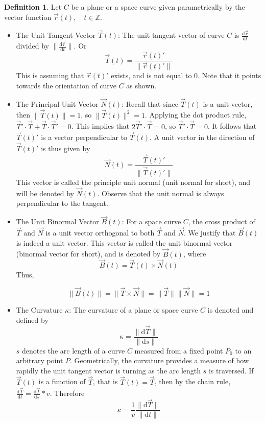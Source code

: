 \documentclass[11pt]{article}
\theoremstyle{plain} %
\theoremstyle{definition}
\newtheorem*{definition}{Definition} %
\theoremstyle{example}
\theoremstyle{remark}
\begin{document}
\begin{definition}

	Let $C$ be a plane or a space curve given parametrically by the vector function $\vec{r}(t), \quad t \in \mathbb Z$.
	
	\begin{itemize}
	
		\item The Unit Tangent Vector $\vec{T}(t)$: The unit tangent vector of curve $C$ is $\frac{\mathrm d \vec{r}}{\mathrm d t}$ divided by $\|\frac{\mathrm d \vec{r}}{\mathrm d t}\|$. Or $$\vec{T}(t) = \frac{\vec{r}(t)'}{\| \vec{r}(t)'\|}$$ This is assuming that $\vec{r}(t)'$ exists, and is not equal to 0. Note that it points towards the orientation of curve $C$ as shown.
		\item The Principal Unit Vector $\vec{N}(t)$: Recall that since $\vec{T}(t)$ is a unit vector, then $\| \vec{T}(t) \| = 1$, so $\| \vec{T}(t) \|^2 = 1$. Applying the dot product rule, $\vec{T}' \cdot \vec{T}+\vec{T} \cdot \vec{T}' = 0$. This implies that $2 \vec{T}' \cdot \vec{T} = 0$, so $ \vec{T}' \cdot \vec{T} = 0$. It follows that $\vec{T}(t)'$ is a vector perpendicular to $\vec{T}(t)$. A unit vector in the direction of $\vec{T}(t)'$ is thus given by $$\vec{N}(t) = \frac{\vec{T}(t)'}{\|\vec{T}(t)'\|}$$ This vector is called the principle unit normal (unit normal for short), and will be denoted by $\vec{N}(t)$. Observe that the unit normal is always perpendicular to the tangent.
		\item The Unit Binormal Vector $\vec{B}(t)$:	For a space curve $C$, the cross product of $\vec{T}$ and $\vec{N}$ is a unit vector orthogonal to both $\vec{T}$ and $\vec{N}$. We justify that $\vec{B}(t)$ is indeed a unit vector. This vector is called the unit binormal vector (binormal vector for short), and is denoted by $\vec{B}(t)$, where $$\vec{B}(t) = \vec{T}(t) \times \vec{N}(t)$$ Thus, 
		
		$$\| \vec{B}(t) \| =\| \vec{T} \times \vec{N} \|= \| \vec{T} \| \| \vec{N} \|  = 1$$
		\item The Curvature $\kappa$: The curvature of a plane or space curve $C$ is denoted and defined by $$\kappa = \frac{\|\mathrm d \vec{T}\|}{\|\mathrm d s\|} $$
		$s$ denotes the arc length of a curve $C$ measured from a fixed point $P_0$ to an arbitrary point $P$. Geometrically, the curvature provides a measure of how rapidly the unit tangent vector is turning as the arc length $s$ is traversed. If $\vec{T}(t)$ is a function of $\vec{T}$, that is $\vec{T}(t) = \vec{T}$, then by the chain rule, $\frac{\mathrm d \vec{T}}{\mathrm d t} = \frac{\mathrm d \vec{T}}{\mathrm d s} * v$. Therefore $$\kappa = \frac{1}{v}\frac{\|\mathrm d \vec{T}\|}{\|\mathrm d t\|} $$
		

\end{itemize}
\end{definition}
\end{document}

